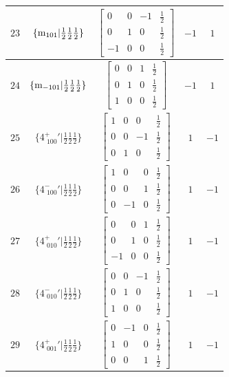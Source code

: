 \documentclass[fleqn,8pt]{jsarticle}
\begin{document}
\begin{longtable}{ccccc}
$ 23 $ & $ \{{\rm m}_{101}|\frac{1}{2} \frac{1}{2} \frac{1}{2}\} $ & $ \begin{bmatrix} 0 & 0 & -1 & \frac{1}{2} \\ 0 & 1 & 0 & \frac{1}{2} \\ -1 & 0 & 0 & \frac{1}{2} \end{bmatrix} $ & $ -1 $ & $ 1 $ \\ \hline
$ 24 $ & $ \{{\rm m}_{-101}|\frac{1}{2} \frac{1}{2} \frac{1}{2}\} $ & $ \begin{bmatrix} 0 & 0 & 1 & \frac{1}{2} \\ 0 & 1 & 0 & \frac{1}{2} \\ 1 & 0 & 0 & \frac{1}{2} \end{bmatrix} $ & $ -1 $ & $ 1 $ \\ \hline
$ 25 $ & $ \{4^{+}_{\,\,100}{}'|\frac{1}{2} \frac{1}{2} \frac{1}{2}\} $ & $ \begin{bmatrix} 1 & 0 & 0 & \frac{1}{2} \\ 0 & 0 & -1 & \frac{1}{2} \\ 0 & 1 & 0 & \frac{1}{2} \end{bmatrix} $ & $ 1 $ & $ -1 $ \\ \hline
$ 26 $ & $ \{4^{-}_{\,\,100}{}'|\frac{1}{2} \frac{1}{2} \frac{1}{2}\} $ & $ \begin{bmatrix} 1 & 0 & 0 & \frac{1}{2} \\ 0 & 0 & 1 & \frac{1}{2} \\ 0 & -1 & 0 & \frac{1}{2} \end{bmatrix} $ & $ 1 $ & $ -1 $ \\ \hline
$ 27 $ & $ \{4^{+}_{\,\,010}{}'|\frac{1}{2} \frac{1}{2} \frac{1}{2}\} $ & $ \begin{bmatrix} 0 & 0 & 1 & \frac{1}{2} \\ 0 & 1 & 0 & \frac{1}{2} \\ -1 & 0 & 0 & \frac{1}{2} \end{bmatrix} $ & $ 1 $ & $ -1 $ \\ \hline
$ 28 $ & $ \{4^{-}_{\,\,010}{}'|\frac{1}{2} \frac{1}{2} \frac{1}{2}\} $ & $ \begin{bmatrix} 0 & 0 & -1 & \frac{1}{2} \\ 0 & 1 & 0 & \frac{1}{2} \\ 1 & 0 & 0 & \frac{1}{2} \end{bmatrix} $ & $ 1 $ & $ -1 $ \\ \hline
$ 29 $ & $ \{4^{+}_{\,\,001}{}'|\frac{1}{2} \frac{1}{2} \frac{1}{2}\} $ & $ \begin{bmatrix} 0 & -1 & 0 & \frac{1}{2} \\ 1 & 0 & 0 & \frac{1}{2} \\ 0 & 0 & 1 & \frac{1}{2} \end{bmatrix} $ & $ 1 $ & $ -1 $ \\ \hline

\end{longtable}
\end{document}
